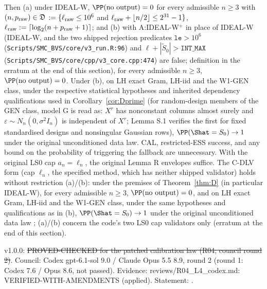 \begin{proposition}
Then (a) under IDEAL-W, $\PP(\text{no output})=0$ for every admissible $n\ge3$ with $(n,p_{\rm raw})\in\mathfrak D$ $:=\{\ell_{\rm raw}\le10^6$ and $\ell_{\rm raw}+\lfloor n/2\rfloor\le2^{31}-1\}$, $\ell_{\rm raw}:=\lceil\log_2(n+p_{\rm raw}+1)\rceil$; and (b) with A:IDEAL-W$^{+}$ in place of IDEAL-W (IDEAL-W, and the two shipped rejection predicates $\texttt{le}>10^6$ (\texttt{Scripts/SMC\_BVS/core/v3\_run.R:96}) and $\ell+|\tilde S_0|>\texttt{INT\_MAX}$ (\texttt{Scripts/SMC\_BVS/core/cpp/v3\_core.cpp:474}) are false; definition in the erratum at the end of this section), for every admissible $n\ge3$, $\PP(\text{no output})=0$. Under (b), on LH exact Gram, LH-iid and the W1-GEN class, under the respective statistical hypotheses and inherited dependency qualifications used in Corollary~\ref{cor:Dprime} (for random-design members of the GEN class, model G is read as: $X^r$ has nonconstant columns almost surely and $\varepsilon\sim N_n(0,\sigma^2I_n)$ is independent of $X^r$; Lemma S.1 verifies the first for fixed standardised designs and nonsingular Gaussian rows), $\PP(\Shat=S_0)\to1$ under the original unconditioned data law. CAL, restricted-ESS success, and any bound on the probability of triggering the fallback are unnecessary. With the original LS0 cap $a_n=\ell_n$, the original Lemma R envelopes suffice. The C-DLV form (cap $\ell_n$, the specified method, which has neither shipped validator) holds without restriction (a)/(b): under the premises of Theorem~\ref{thm:D} (in particular IDEAL-W), for every admissible $n\ge3$, $\PP(\text{no output})=0$, and on LH exact Gram, LH-iid and the W1-GEN class, under the same hypotheses and qualifications as in (b), $\PP(\Shat=S_0)\to1$ under the original unconditioned data law ; (a)/(b) concern the code's two LS0 cap validators only (erratum at the end of this section).
\end{proposition}
\begin{statusbox}
 v1.0.0: \st{PROVED-CHECKED for the patched calibration law (R04; council round 2)}. Council: Codex gpt-6.1-sol 9.0 / Claude Opus 5.5 8.9, round 2 (round 1: Codex 7.6 / Opus 8.6, not passed). Evidence: reviews/R04\_L4\_codex.md: VERIFIED-WITH-AMENDMENTS (applied). Statement: .
\end{statusbox}
